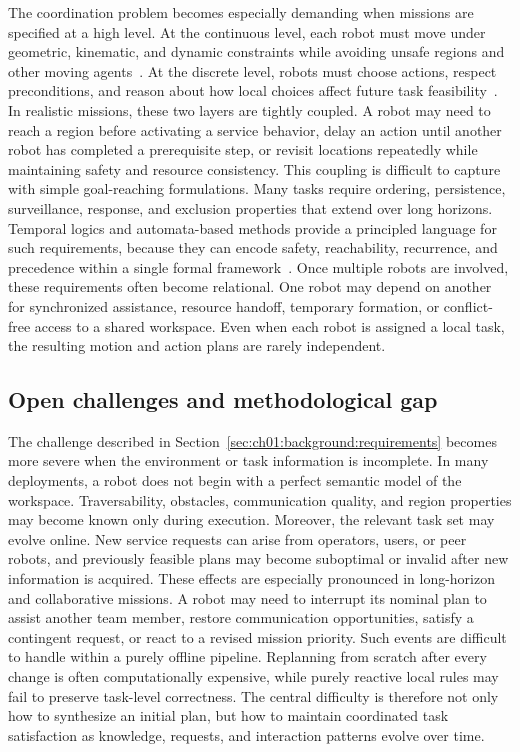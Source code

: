 The coordination problem becomes especially demanding when missions are
specified at a high level. At the continuous level, each robot must move under
geometric, kinematic, and dynamic constraints while avoiding unsafe regions and
other moving agents~\citep{lavalle2006planning}. At the discrete level, robots
must choose actions, respect preconditions, and reason about how local choices
affect future task feasibility~\citep{ghallab2004automated}. In realistic
missions, these two layers are tightly coupled. A robot may need to reach a
region before activating a service behavior, delay an action until another
robot has completed a prerequisite step, or revisit locations repeatedly while
maintaining safety and resource consistency.
This coupling is difficult to capture with simple goal-reaching formulations.
Many tasks require ordering, persistence, surveillance, response, and exclusion
properties that extend over long horizons. Temporal logics and automata-based
methods provide a principled language for such requirements, because they can
encode safety, reachability, recurrence, and precedence within a single formal
framework~\citep{baier2008principles,belta2007symbolic,tabuada2006linear}. Once
multiple robots are involved, these requirements often become relational. One
robot may depend on another for synchronized assistance, resource handoff,
temporary formation, or conflict-free access to a shared workspace. Even when
each robot is assigned a local task, the resulting motion and action plans are
rarely independent.

\subsection{Open challenges and methodological gap}
\label{sec:ch01:background:gap}


The challenge described in
Section~\ref{sec:ch01:background:requirements} becomes more severe when the
environment or task information is incomplete. In many deployments, a robot
does not begin with a perfect semantic model of the workspace. Traversability,
obstacles, communication quality, and region properties may become known only
during execution. Moreover, the relevant task set may evolve online. New
service requests can arise from operators, users, or peer robots, and
previously feasible plans may become suboptimal or invalid after new
information is acquired.
These effects are especially pronounced in long-horizon and collaborative
missions. A robot may need to interrupt its nominal plan to assist another team
member, restore communication opportunities, satisfy a contingent request, or
react to a revised mission priority. Such events are difficult to handle within
a purely offline pipeline. Replanning from scratch after every change is often
computationally expensive, while purely reactive local rules may fail to
preserve task-level correctness. The central difficulty is therefore not only
how to synthesize an initial plan, but how to maintain coordinated task
satisfaction as knowledge, requests, and interaction patterns evolve over time.


